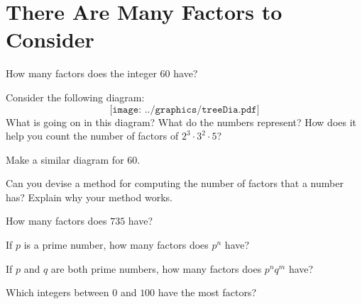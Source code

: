 \newpage
\section{There Are Many Factors to Consider}\label{A:CF}


\begin{prob} How many factors does the integer $60$ have?
\end{prob}

\begin{prob}
Consider the following diagram:
\[
\texttt{[image: ../graphics/treeDia.pdf]}
\]
What is going on in this diagram? What do the numbers represent? How
does it help you count the number of factors of $2^3\cdot 3^2 \cdot
5$?
\end{prob}

\begin{prob}
Make a similar diagram for $60$.
\end{prob}

\begin{prob} 
Can you devise a method for computing the number of factors that a
number has? Explain why your method works.
\end{prob}

\begin{prob} How many factors does $735$ have?
\end{prob}

\begin{prob} 
If $p$ is a prime number, how many factors does $p^n$ have?
\end{prob}

\begin{prob} 
If $p$ and $q$ are both prime numbers, how many factors does $p^nq^m$
have?
\end{prob}

\begin{prob} Which integers between $0$ and $100$ have the most factors?         
\end{prob}
